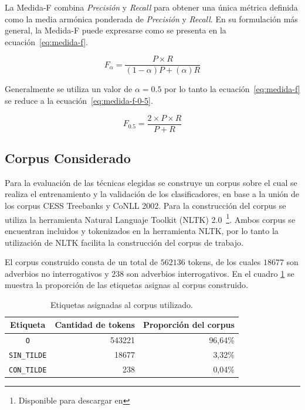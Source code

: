 \documentclass[runningheads,a4paper]{llncs}
\begin{document}
La Medida-F combina \emph{Precisi\'on} y \emph{Recall} para obtener una \'unica m\'etrica definida como la media arm\'onica ponderada de \emph{Precisi\'on} y \emph{Recall}. En su formulaci\'on m\'as general, la Medida-F puede expresarse como se presenta en la ecuaci\'on~\ref{eq:medida-f}.

\begin{equation}
	\label{eq:medida-f}
	F_{\alpha} = \frac{P \times R}{(1 - \alpha)P + (\alpha)R}
\end{equation}

Generalmente se utiliza un valor de $\alpha=0.5$ por lo tanto la ecuación~\ref{eq:medida-f} se reduce a la ecuación~\ref{eq:medida-f-0-5}\cite{MAKHOUL99}.

\begin{equation}
	\label{eq:medida-f-0-5}
	F_{0.5} = \frac{2 \times P \times R}{P + R}
\end{equation}

\subsection{Corpus Considerado}
Para la evaluación de las técnicas elegidas se construye un corpus sobre el cual se realiza el entrenamiento y la validación de los clasificadores,  en base a la unión de los corpus CESS Treebanks y CoNLL 2002. Para la construcción del corpus se utiliza la herramienta Natural Languaje Toolkit (NLTK) 2.0~\footnote{Disponible para descargar en \nltk}. Ambos corpus se encuentran incluidos y tokenizados en la herramienta NLTK, por lo tanto la utilización de NLTK facilita la construcción del corpus de trabajo.

El corpus construido consta de un total de $562136$ tokens, de los cuales $18677$ son adverbios no interrogativos y $238$ son adverbios interrogativos. En el cuadro \ref{table:corpus} se muestra la proporci\'on de las etiquetas asignas al corpus construido.


\begin{table}[ht]
 	\renewcommand{\arraystretch}{1.3}
	\renewcommand{\tabcolsep}{3pt}
	\caption{Etiquetas asignadas al corpus utilizado.}
	\label{table:corpus}
	\centering
	\begin{tabular}{c r r}
		\hline\hline
		\multicolumn{1}{c}{\textbf{Etiqueta}} & \multicolumn{1}{c}{\textbf{Cantidad de tokens}} & \multicolumn{1}{c}{\textbf{Proporci\'on del corpus}} \\
		\hline
		\texttt{O} & 543221 & 96,64\% \\
		\texttt{SIN\_TILDE} & 18677 & 3,32\% \\
		\texttt{CON\_TILDE} & 238 & 0,04\% \\
		\hline
	\end{tabular}
\end{table}
\end{document}
